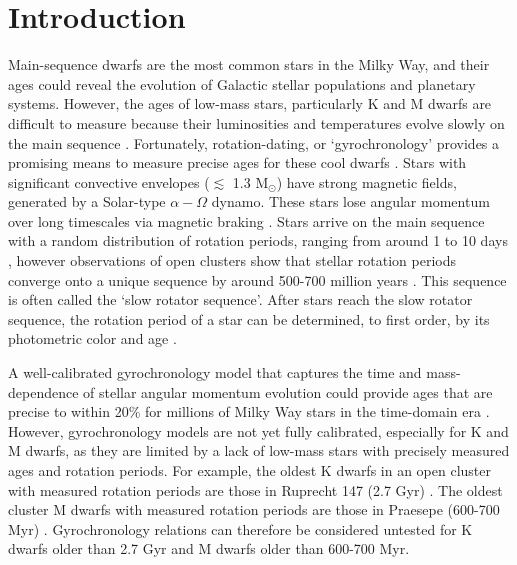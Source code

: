 \section{Introduction}

Main-sequence dwarfs are the most common stars in the Milky Way, and their
ages could reveal the evolution of Galactic stellar populations and planetary
systems.
However, the ages of low-mass stars, particularly K and M dwarfs are difficult
to measure because their luminosities and temperatures evolve slowly on the
main sequence \citep[see][for a review of stellar ages]{soderblom2010}.
Fortunately, rotation-dating, or `gyrochronology’ provides a promising means
to measure precise ages for these cool dwarfs
\citep[\eg][]{schatzman1962, weber1967, kraft1967, skumanich1972, kawaler1988,
pinsonneault1989, barnes2003, barnes2007, mamajek2008, barnes2010, meibom2011,
epstein2014, meibom2015, vansaders2016, vansaders2018, claytor2020}.
Stars with significant convective envelopes ($\lesssim$ 1.3 M$_\odot$) have
strong magnetic fields, generated by a Solar-type $\alpha-\Omega$ dynamo.
These stars lose angular momentum over long timescales via magnetic braking
\citep[\eg][]{schatzman1962, weber1967, kraft1967, skumanich1972, kawaler1988,
pinsonneault1989}.
Stars arrive on the main sequence with a random distribution of rotation
periods, ranging from around 1 to 10 days \citep[\eg][]{rebull2018}, however
observations of open clusters show that stellar rotation periods
converge onto a unique sequence by around 500-700 million years
\citep[\eg][]{irwin2009, gallet2013}.
This sequence is often called the `slow rotator sequence'.
After stars reach the slow rotator sequence, the rotation period of a star can
be determined, to first order, by its photometric color and age
\citep[\eg][]{barnes2003, barnes2007, barnes2010, meibom2011, meibom2015}.

A well-calibrated gyrochronology model that captures the time and
mass-dependence of stellar angular momentum evolution could provide ages that
are precise to within 20\% for millions of Milky Way stars in the time-domain
era \citep{epstein2014, najita2016, angus2019, claytor2020}.
However, gyrochronology models are not yet fully calibrated, especially for K
and M dwarfs, as they are limited by a lack of low-mass stars with precisely
measured ages and rotation periods.
For example, the oldest K dwarfs in an open cluster with measured rotation
periods are those in Ruprecht 147 (2.7 Gyr) \citep{curtis2020}.
The oldest cluster M dwarfs with measured rotation periods are those in
Praesepe (600-700 Myr) \citep{douglas2017, rebull2017}.
Gyrochronology relations can therefore be considered untested for K dwarfs
older than 2.7 Gyr and M dwarfs older than 600-700 Myr.

